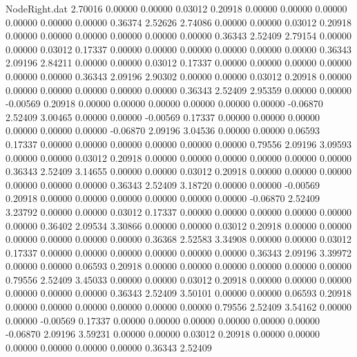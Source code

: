 \begin{filecontents}{NodeRight.dat}
   2.70016    0.00000    0.00000     0.03012    0.20918    0.00000    0.00000    0.00000    0.00000    0.00000    0.00000    0.36374    2.52626
   2.74086    0.00000    0.00000     0.03012    0.20918    0.00000    0.00000    0.00000    0.00000    0.00000    0.00000    0.36343    2.52409
   2.79154    0.00000    0.00000     0.03012    0.17337    0.00000    0.00000    0.00000    0.00000    0.00000    0.00000    0.36343    2.09196
   2.84211    0.00000    0.00000     0.03012    0.17337    0.00000    0.00000    0.00000    0.00000    0.00000    0.00000    0.36343    2.09196
   2.90302    0.00000    0.00000     0.03012    0.20918    0.00000    0.00000    0.00000    0.00000    0.00000    0.00000    0.36343    2.52409
   2.95359    0.00000    0.00000    -0.00569    0.20918    0.00000    0.00000    0.00000    0.00000    0.00000    0.00000   -0.06870    2.52409
   3.00465    0.00000    0.00000    -0.00569    0.17337    0.00000    0.00000    0.00000    0.00000    0.00000    0.00000   -0.06870    2.09196
   3.04536    0.00000    0.00000     0.06593    0.17337    0.00000    0.00000    0.00000    0.00000    0.00000    0.00000    0.79556    2.09196
   3.09593    0.00000    0.00000     0.03012    0.20918    0.00000    0.00000    0.00000    0.00000    0.00000    0.00000    0.36343    2.52409
   3.14655    0.00000    0.00000     0.03012    0.20918    0.00000    0.00000    0.00000    0.00000    0.00000    0.00000    0.36343    2.52409
   3.18720    0.00000    0.00000    -0.00569    0.20918    0.00000    0.00000    0.00000    0.00000    0.00000    0.00000   -0.06870    2.52409
   3.23792    0.00000    0.00000     0.03012    0.17337    0.00000    0.00000    0.00000    0.00000    0.00000    0.00000    0.36402    2.09534
   3.30866    0.00000    0.00000     0.03012    0.20918    0.00000    0.00000    0.00000    0.00000    0.00000    0.00000    0.36368    2.52583
   3.34908    0.00000    0.00000     0.03012    0.17337    0.00000    0.00000    0.00000    0.00000    0.00000    0.00000    0.36343    2.09196
   3.39972    0.00000    0.00000     0.06593    0.20918    0.00000    0.00000    0.00000    0.00000    0.00000    0.00000    0.79556    2.52409
   3.45033    0.00000    0.00000     0.03012    0.20918    0.00000    0.00000    0.00000    0.00000    0.00000    0.00000    0.36343    2.52409
   3.50101    0.00000    0.00000     0.06593    0.20918    0.00000    0.00000    0.00000    0.00000    0.00000    0.00000    0.79556    2.52409
   3.54162    0.00000    0.00000    -0.00569    0.17337    0.00000    0.00000    0.00000    0.00000    0.00000    0.00000   -0.06870    2.09196
   3.59231    0.00000    0.00000     0.03012    0.20918    0.00000    0.00000    0.00000    0.00000    0.00000    0.00000    0.36343    2.52409

\end{filecontents}
